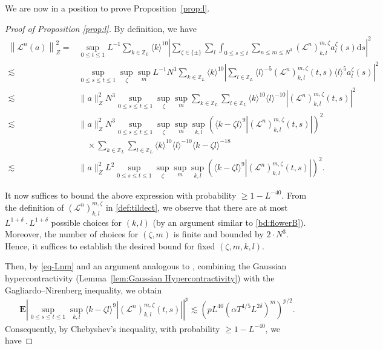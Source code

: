 \documentclass[UTF-8,reqno]{amsart}
\numberwithin{equation}{section}
\theoremstyle{definition}
\def\geq{\geqslant}
\def\leq{\leqslant}
\def\geq{\geqslant}
\def\leq{\leqslant}
\begin{document}
We are now in a position to prove Proposition~\ref{prop:l}.
\begin{proof}[Proof of Proposition \ref{prop:l}]
    By definition, we have
\begin{align*}
\left\|\mathscr{L}^{n}(a)\right\|_{Z}^{2}= & \sup _{0 \leq t \leq 1} L^{-1} \sum_{k \in \mathbb{Z}_{L}}\langle k\rangle^{10}\left|\sum_{\zeta \in\{ \pm\}} \sum_{l} \int_{0 \leq s \leq t} \sum_{n \leq m \leq N^{3}}\left(\mathscr{L}^{n}\right)_{k, l}^{m, \zeta} a_{l}^{\zeta}(s) \mathrm{d} s\right|^{2} \\
\lesssim & \sup _{0 \leq s \leq t \leq 1} \sup _{\zeta} \sup _{m} L^{-1} N^{3} \sum_{k \in \mathbb{Z}_{L}}\langle k\rangle^{10}\left| \sum_{l \in \mathbb{Z}_{L}}\langle l\rangle^{-5}\left(\mathscr{L}^{n}\right)_{k, l}^{m, \zeta}(t, s)\langle l\rangle^{5} a_{l}^{\zeta}(s)\right|^{2} \\
\lesssim & \|a\|_{Z}^{2} N^{3} \sup _{0 \leq s \leq t \leq 1} \sup _{\zeta} \sup _{m} \sum_{k \in \mathbb{Z}_{L}}\sum_{l \in \mathbb{Z}_{L}}\langle k\rangle^{10}\langle l\rangle^{-10}\left|\left(\mathscr{L}^{n}\right)_{k, l}^{m, \zeta}(t, s)\right|^2 \\
\lesssim & \|a\|_{Z}^{2} N^{3} \sup _{0 \leq s \leq t \leq 1} \sup _{\zeta} \sup _{m} \sup _{k, l}\left(\langle k-\zeta  l\rangle^{9}\left|\left(\mathscr{L}^{n}\right)_{k, l}^{m, \zeta}(t, s)\right|\right)^{2}\\
& \quad\times\sum_{k \in \mathbb{Z}_{L}}\sum_{l \in \mathbb{Z}_{L}}\langle k\rangle^{10}\langle l\rangle^{-10} \langle k-\zeta  l\rangle^{-18}\\
\lesssim & \|a\|_{Z}^{2}  L^2\sup _{0 \leq s \leq t \leq 1} \sup _{\zeta} \sup _{m} \sup _{k, l}\left(\langle k-\zeta  l\rangle^{9}\left|\left(\mathscr{L}^{n}\right)_{k, l}^{m, \zeta}(t, s)\right|\right)^{2}.
\end{align*}

It now suffices to bound the above expression with probability  $\geq 1 - L^{-40}$. From the definition of $\left(\mathscr{L}^{n}\right)_{k, l}^{m, \zeta}$ in \eqref{def:tildect}, we observe that there are at most $L^{1+\delta}\cdot L^{1+\delta}$ possible choices for $(k,l)$ (by an argument similar to \eqref{bd:flowerB}).
Moreover, the number of choices for $(\zeta,m)$ is finite and bounded by $2\cdot N^3$. Hence, it suffices to establish the desired bound for fixed $(\zeta,m,k,l)$.

Then, by \eqref{eq-Lnm} and an argument analogous to \cite[Proposition 12.1]{DH23a}, 
combining the Gaussian hypercontractivity (Lemma~\ref{lem:Gaussian Hypercontractivity}) 
with the Gagliardo--Nirenberg inequality, we obtain
\begin{align*}
  \mathbf{E}\left|  \sup _{0 \leq s \leq t \leq 1}   \sup _{k, l} \langle k-\zeta  l\rangle^{9}\left|\left(\mathscr{L}^{n}\right)_{k, l}^{m, \zeta}(t, s)\right|\right|^p\lesssim (p L^{40} (\alpha  T^{4/5} L^{2\delta})^{m})^{p/2}.
\end{align*}
Consequently, by Chebyshev’s inequality, with probability  $\geq 1 - L^{-40}$, we have


\end{proof}
\end{document}
